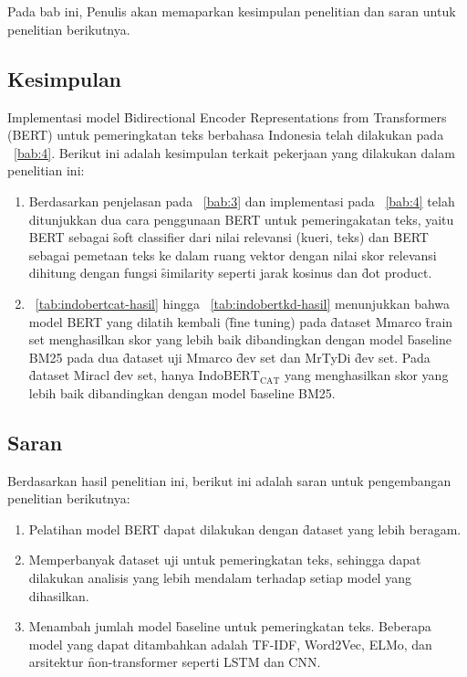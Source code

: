\chapter{\kesimpulan}
\label{bab:6}
Pada bab ini, Penulis akan memaparkan kesimpulan penelitian dan saran untuk penelitian berikutnya.


\section{Kesimpulan}
\label{sec:kesimpulan}
Implementasi model \f{Bidirectional Encoder Representations from Transformers} (BERT) untuk pemeringkatan teks berbahasa Indonesia telah dilakukan pada \sect~\ref{bab:4}. Berikut ini adalah kesimpulan terkait pekerjaan yang dilakukan dalam penelitian ini:

\begin{enumerate}
	\item  Berdasarkan penjelasan pada \sect~\ref{bab:3} dan implementasi pada \sect~\ref{bab:4} telah ditunjukkan dua cara penggunaan BERT untuk pemeringakatan teks, yaitu BERT sebagai \f{soft classifier} dari nilai relevansi (kueri, teks) dan BERT sebagai pemetaan teks ke dalam ruang vektor dengan nilai skor relevansi dihitung dengan fungsi \f{similarity} seperti jarak kosinus dan \f{dot product}.
	\item \tab~\ref{tab:indobertcat-hasil} hingga \tab~\ref{tab:indobertkd-hasil} menunjukkan bahwa model BERT yang dilatih kembali (\f{fine tuning}) pada \f{dataset} Mmarco \f{train set} menghasilkan skor yang lebih baik dibandingkan dengan model \f{baseline} BM25 pada dua \f{dataset} uji Mmarco \f{dev set} dan MrTyDi \f{dev set}. Pada \f{dataset} Miracl \f{dev set}, hanya $\text{IndoBERT}_{\text{CAT}}$ yang menghasilkan skor yang lebih baik dibandingkan dengan model \f{baseline} BM25.
\end{enumerate}

\section{Saran}
\label{sec:saran}
Berdasarkan hasil penelitian ini, berikut ini adalah saran untuk pengembangan penelitian berikutnya:
\begin{enumerate}
	\item Pelatihan model BERT dapat dilakukan dengan \f{dataset} yang lebih beragam. 
	\item Memperbanyak \f{dataset} uji untuk pemeringkatan teks, sehingga dapat dilakukan analisis yang lebih mendalam terhadap setiap model yang dihasilkan.
	\item Menambah jumlah model \f{baseline} untuk pemeringkatan teks. Beberapa model yang dapat ditambahkan adalah TF-IDF, Word2Vec, ELMo, dan arsitektur \f{non-transformer} seperti LSTM dan CNN.
\end{enumerate}
